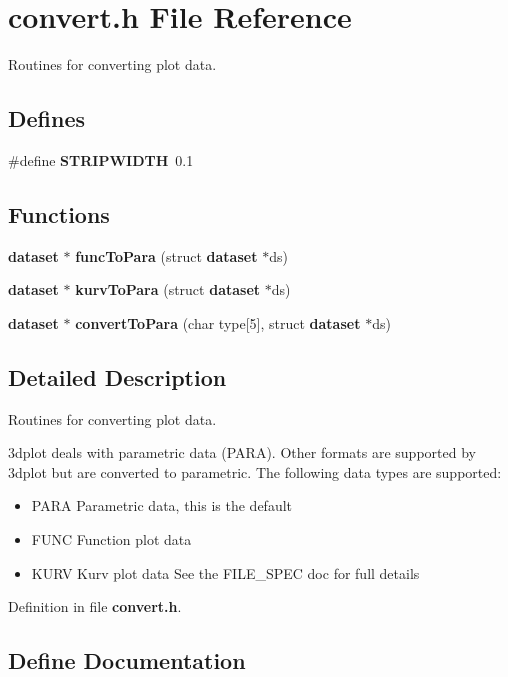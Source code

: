 \section{convert.h File Reference}
\label{convert_8h}
Routines for converting plot data.  


\subsection*{Defines}
\begin{CompactItemize}
\item 
\#define {\bf STRIPWIDTH}\ 0.1
\end{CompactItemize}
\subsection*{Functions}
\begin{CompactItemize}
\item 
{\bf dataset} $\ast$ {\bf func\-To\-Para} (struct {\bf dataset} $\ast$ds)
\item 
{\bf dataset} $\ast$ {\bf kurv\-To\-Para} (struct {\bf dataset} $\ast$ds)
\item 
{\bf dataset} $\ast$ {\bf convert\-To\-Para} (char type[5], struct {\bf dataset} $\ast$ds)
\end{CompactItemize}


\subsection{Detailed Description}
Routines for converting plot data. 

3dplot deals with parametric data (PARA). Other formats are supported by 3dplot but are converted to parametric. The following data types are supported:\begin{itemize}
\item PARA Parametric data, this is the default\item FUNC Function plot data\item KURV Kurv plot data See the FILE\_\-SPEC doc for full details\end{itemize}


Definition in file {\bf convert.h}.

\subsection{Define Documentation}
